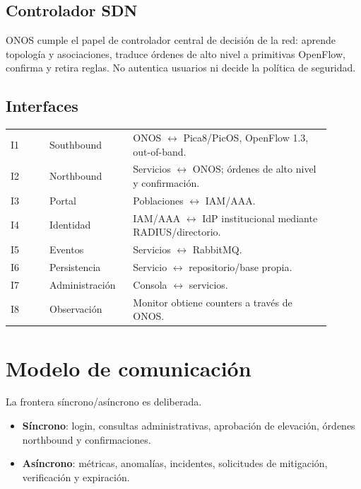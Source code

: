\documentclass[11pt,a4paper]{article}
\begin{document}
\subsection{Controlador SDN}

ONOS cumple el papel de controlador central de decisión de la red: aprende topología y asociaciones, traduce órdenes de alto nivel a primitivas OpenFlow, confirma y retira reglas. No autentica usuarios ni decide la política de seguridad.

\subsection{Interfaces}

\begin{longtable}{p{0.11\linewidth}p{0.23\linewidth}p{0.56\linewidth}}
\toprule
I1 & Southbound & ONOS \(\leftrightarrow\) Pica8/PicOS, OpenFlow 1.3, out-of-band.\\
I2 & Northbound & Servicios \(\leftrightarrow\) ONOS; órdenes de alto nivel y confirmación.\\
I3 & Portal & Poblaciones \(\leftrightarrow\) IAM/AAA.\\
I4 & Identidad & IAM/AAA \(\leftrightarrow\) IdP institucional mediante RADIUS/directorio.\\
I5 & Eventos & Servicios \(\leftrightarrow\) RabbitMQ.\\
I6 & Persistencia & Servicio \(\leftrightarrow\) repositorio/base propia.\\
I7 & Administración & Consola \(\leftrightarrow\) servicios.\\
I8 & Observación & Monitor obtiene counters a través de ONOS.\\
\bottomrule
\end{longtable}

\section{Modelo de comunicación}

La frontera síncrono/asíncrono es deliberada.

\begin{itemize}
\item \textbf{Síncrono}: login, consultas administrativas, aprobación de elevación, órdenes northbound y confirmaciones.
\item \textbf{Asíncrono}: métricas, anomalías, incidentes, solicitudes de mitigación, verificación y expiración.
\end{itemize}
\end{document}

